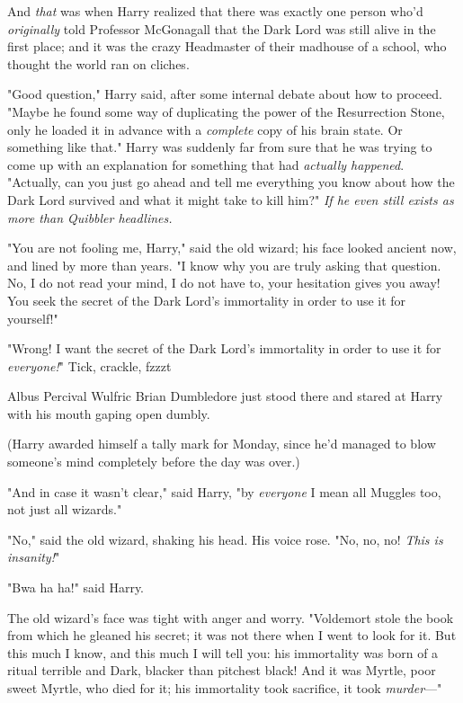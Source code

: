 And \emph{that} was when Harry realized that there was exactly one person who'd
\emph{originally} told Professor McGonagall that the Dark Lord was still alive
in the first place; and it was the crazy Headmaster of their madhouse of a
school, who thought the world ran on cliches.

"Good question," Harry said, after some internal debate about how to proceed.
"Maybe he found some way of duplicating the power of the Resurrection Stone,
only he loaded it in advance with a \emph{complete} copy of his brain state. Or
something like that." Harry was suddenly far from sure that he was trying to
come up with an explanation for something that had \emph{actually happened}.
"Actually, can you just go ahead and tell me everything you know about how the
Dark Lord survived and what it might take to kill him?"  \emph{If he even still
exists as more than Quibbler headlines.}

"You are not fooling me, Harry," said the old wizard; his face looked ancient
now, and lined by more than years. "I know why you are truly asking that
question. No, I do not read your mind, I do not have to, your hesitation gives
you away! You seek the secret of the Dark Lord's immortality in order to use it
for yourself!"

"Wrong! I want the secret of the Dark Lord's immortality in order to use it for
\emph{everyone!}"
\sbreak
Tick, crackle, fzzzt{\el}

Albus Percival Wulfric Brian Dumbledore just stood there and stared at Harry
with his mouth gaping open dumbly.

(Harry awarded himself a tally mark for Monday, since he'd managed to blow
someone's mind completely before the day was over.)

"And in case it wasn't clear," said Harry, "by \emph{everyone} I mean all
Muggles too, not just all wizards."

"No," said the old wizard, shaking his head. His voice rose. "No, no, no!
\emph{This is insanity!}"

"Bwa ha ha!" said Harry.

The old wizard's face was tight with anger and worry. "Voldemort stole the book
from which he gleaned his secret; it was not there when I went to look for it.
But this much I know, and this much I will tell you: his immortality was born
of a ritual terrible and Dark, blacker than pitchest black! And it was Myrtle,
poor sweet Myrtle, who died for it; his immortality took sacrifice, it took
\emph{murder}—"

